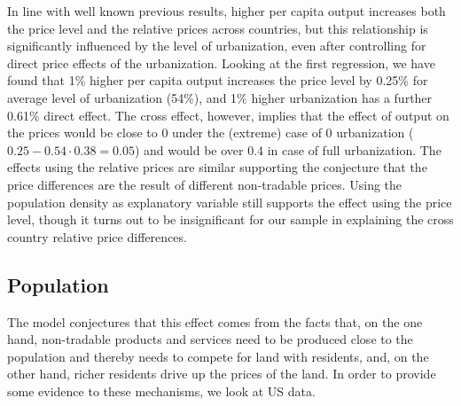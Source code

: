 \documentclass[12pt]{article}
\begin{document}
In line with well known previous results, higher per capita output
increases both the price level and the relative prices across
countries, but this relationship is significantly influenced by the
level of urbanization, even after controlling for direct price
effects of the urbanization. Looking at the first regression, we
have found that 1\% higher per capita output increases the price
level by 0.25\% for average level of urbanization (54\%), and 1\%
higher urbanization has a further 0.61\% direct effect. The cross
effect, however, implies that the effect of output on the prices
would be close to 0 under the (extreme) case of 0 urbanization
($0.25-0.54\cdot0.38=0.05$) and would be over 0.4 in case of full
urbanization. The effects using the relative prices are similar
supporting the conjecture that the price differences are the result
of different non-tradable prices. Using the population density as
explanatory variable still supports the effect using the price
level, though it turns out to be insignificant for our sample in
explaining the cross country relative price differences.

\subsection{Population }
The model conjectures that this effect comes from the facts that, on
the one hand, non-tradable products and services need to be produced
close to the population and thereby needs to compete for land with
residents, and, on the other hand, richer residents drive up the
prices of the land. In order to provide some evidence to these
mechanisms, we look at US data.
\end{document}
